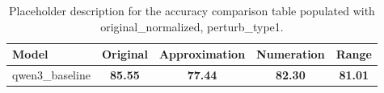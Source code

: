 \begin{table}[ht]
\centering
{}
\small
\begin{tabular}{lcccc}
\hline
Model & Original & Approximation & Numeration & Range \\
\hline
qwen3\_baseline & \textbf{85.55} & \textbf{77.44} & \textbf{82.30} & \textbf{81.01} \\
\hline
\end{tabular}
\caption{Placeholder description for the accuracy comparison table populated with original\_normalized, perturb\_type1.}
\end{table}
